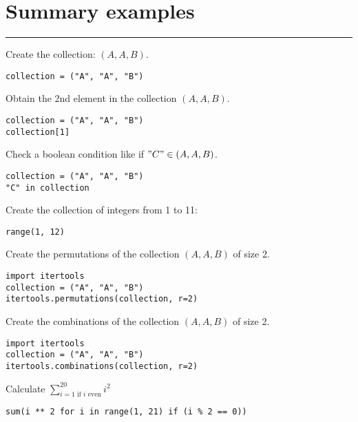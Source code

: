 \documentclass{article}
\begin{document}
\section{Summary examples}
\hrule

\begin{multicols}{2}
    Create the collection: \((A, A, B)\).

        \begin{verbatim}
collection = ("A", "A", "B")
    \end{verbatim}

        Obtain the 2nd element in the collection \((A, A, B)\).

        \begin{verbatim}
collection = ("A", "A", "B")
collection[1]
        \end{verbatim}

        Check a boolean condition like if \("C"\in (A, A, B)\).

        \begin{verbatim}
collection = ("A", "A", "B")
"C" in collection
        \end{verbatim}

        Create the collection of integers from 1 to 11:

        \begin{verbatim}
range(1, 12)
        \end{verbatim}

        Create the permutations of the collection \((A, A, B)\) of size 2.

        \begin{verbatim}
import itertools
collection = ("A", "A", "B")
itertools.permutations(collection, r=2)
        \end{verbatim}

        Create the combinations of the collection \((A, A, B)\) of size 2.

        \begin{verbatim}
import itertools
collection = ("A", "A", "B")
itertools.combinations(collection, r=2)
        \end{verbatim}

        Calculate \(\sum_{i=1\text{ if }i\text{ even}}^{20}i ^ 2\)

        \begin{verbatim}
sum(i ** 2 for i in range(1, 21) if (i % 2 == 0))
        \end{verbatim}


\end{multicols}
\end{document}
